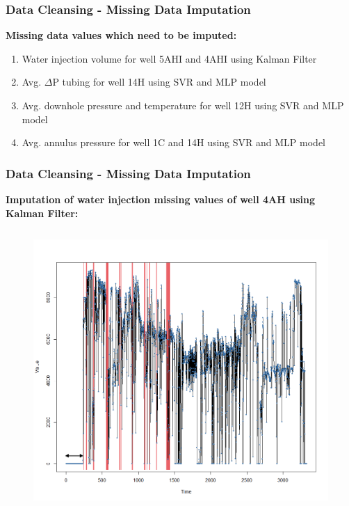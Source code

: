 \documentclass[xcolor=table]{beamer}
\begin{document}
\begin{frame}
\frametitle{Data Cleansing - Missing Data Imputation}
\textbf{Missing data values which need to be imputed:}
\begin{enumerate}
\item Water injection volume for well 5AHI and 4AHI using Kalman Filter
\item Avg. $\Delta$P tubing for well 14H using SVR and MLP model
\item Avg. downhole pressure and temperature for well 12H using SVR and MLP model
\item Avg. annulus pressure for well 1C and 14H using SVR and MLP model
\end{enumerate}

\end{frame}

\begin{frame}
\frametitle{Data Cleansing - Missing Data Imputation}
\textbf{Imputation of water injection missing values of well 4AH using Kalman Filter:}
\begin{columns}[c]
\begin{figure}
\includegraphics[width=1\linewidth,left]{WI_missing1.png} 
\end{figure}



\end{columns}
\end{frame}
\end{document}

